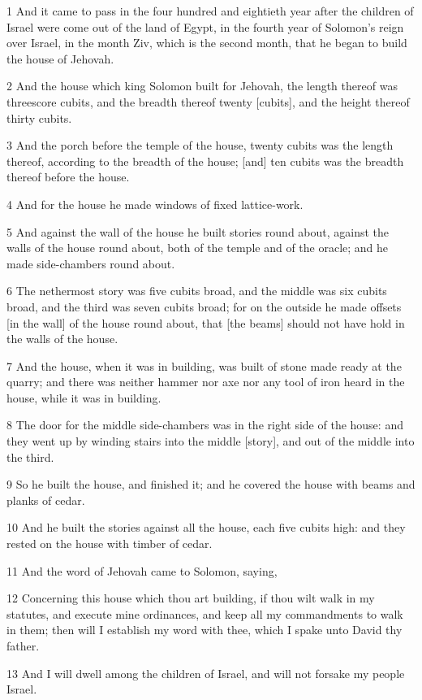 \par 1 And it came to pass in the four hundred and eightieth year after the children of Israel were come out of the land of Egypt, in the fourth year of Solomon's reign over Israel, in the month Ziv, which is the second month, that he began to build the house of Jehovah.
\par 2 And the house which king Solomon built for Jehovah, the length thereof was threescore cubits, and the breadth thereof twenty [cubits], and the height thereof thirty cubits.
\par 3 And the porch before the temple of the house, twenty cubits was the length thereof, according to the breadth of the house; [and] ten cubits was the breadth thereof before the house.
\par 4 And for the house he made windows of fixed lattice-work.
\par 5 And against the wall of the house he built stories round about, against the walls of the house round about, both of the temple and of the oracle; and he made side-chambers round about.
\par 6 The nethermost story was five cubits broad, and the middle was six cubits broad, and the third was seven cubits broad; for on the outside he made offsets [in the wall] of the house round about, that [the beams] should not have hold in the walls of the house.
\par 7 And the house, when it was in building, was built of stone made ready at the quarry; and there was neither hammer nor axe nor any tool of iron heard in the house, while it was in building.
\par 8 The door for the middle side-chambers was in the right side of the house: and they went up by winding stairs into the middle [story], and out of the middle into the third.
\par 9 So he built the house, and finished it; and he covered the house with beams and planks of cedar.
\par 10 And he built the stories against all the house, each five cubits high: and they rested on the house with timber of cedar.
\par 11 And the word of Jehovah came to Solomon, saying,
\par 12 Concerning this house which thou art building, if thou wilt walk in my statutes, and execute mine ordinances, and keep all my commandments to walk in them; then will I establish my word with thee, which I spake unto David thy father.
\par 13 And I will dwell among the children of Israel, and will not forsake my people Israel.
